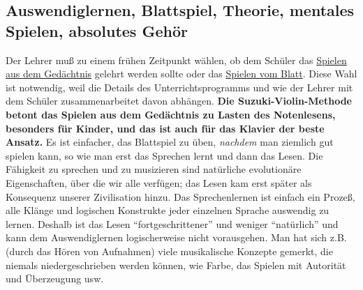 \subsection{Auswendiglernen, Blattspiel, Theorie, mentales Spielen, absolutes Gehör}\hypertarget{c1iii16c}{}

Der Lehrer muß zu einem frühen Zeitpunkt wählen, ob dem Schüler das \hyperlink{c1iii6}{Spielen aus dem Gedächtnis} gelehrt werden sollte oder das \hyperlink{c1iii11}{Spielen vom Blatt}.
Diese Wahl ist notwendig, weil die Details des Unterrichtsprogramms und wie der Lehrer mit dem Schüler zusammenarbeitet davon abhängen.
\textbf{Die Suzuki-Violin-Methode betont das Spielen aus dem Gedächtnis zu Lasten des Notenlesens, besonders für Kinder, und das ist auch für das Klavier der beste Ansatz.}
Es ist einfacher, das Blattspiel zu üben, \textit{nachdem} man ziemlich gut spielen kann,
so wie man erst das Sprechen lernt und dann das Lesen.
Die Fähigkeit zu sprechen und zu musizieren sind natürliche evolutionäre Eigenschaften, über die wir alle verfügen; das Lesen kam erst später als Konsequenz unserer Zivilisation hinzu.
Das Sprechenlernen ist einfach ein Prozeß, alle Klänge und logischen Konstrukte jeder einzelnen Sprache auswendig zu lernen.
Deshalb ist das Lesen \enquote{fortgeschrittener} und weniger \enquote{natürlich} und kann dem Auswendiglernen logischerweise nicht vorausgehen.
Man hat sich z.B. (durch das Hören von Aufnahmen) viele musikalische Konzepte gemerkt, die niemals niedergeschrieben werden können, wie Farbe, das Spielen mit Autorität und Überzeugung usw.

